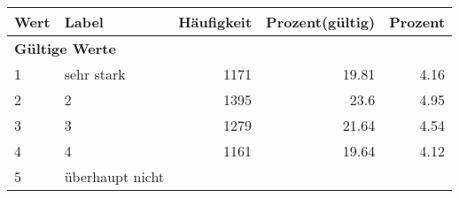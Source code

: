      \begin{longtable}{lXrrr}
     \toprule
     \textbf{Wert} & \textbf{Label} & \textbf{Häufigkeit} & \textbf{Prozent(gültig)} & \textbf{Prozent} \\
     \endhead
     \midrule
     \multicolumn{5}{l}{\textbf{Gültige Werte}}\\

     1 &
     \multicolumn{1}{X}{ sehr stark   } &


       \num{1171} &
       \num[round-mode=places,round-precision=2]{19,81} &
         \num[round-mode=places,round-precision=2]{4,16} \\

     2 &
     \multicolumn{1}{X}{ 2   } &


       \num{1395} &
       \num[round-mode=places,round-precision=2]{23,6} &
         \num[round-mode=places,round-precision=2]{4,95} \\

     3 &
     \multicolumn{1}{X}{ 3   } &


       \num{1279} &
       \num[round-mode=places,round-precision=2]{21,64} &
         \num[round-mode=places,round-precision=2]{4,54} \\

     4 &
     \multicolumn{1}{X}{ 4   } &


       \num{1161} &
       \num[round-mode=places,round-precision=2]{19,64} &
         \num[round-mode=places,round-precision=2]{4,12} \\

     5 &
     \multicolumn{1}{X}{ überhaupt nicht   } &



\end{longtable}
